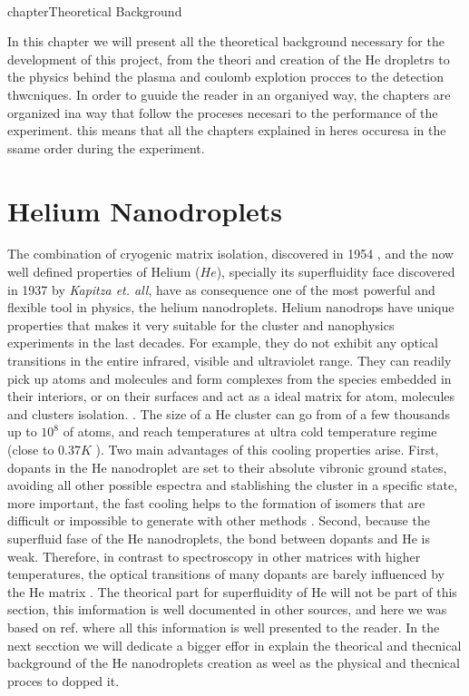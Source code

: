 
\\chapter{Theoretical Background}

In this chapter we will present all the theoretical background necessary for the development of this project, from the theori and creation of the He dropletrs to the physics behind the plasma and coulomb explotion procces to the detection thwcniques. In order to guuide the reader in an organiyed way, the chapters are organized ina way that follow the proceses necesari to the performance of the experiment. this means that all the chapters explained in heres occuresa in the ssame order during the experiment.


\section{Helium Nanodroplets}

The combination of cryogenic matrix isolation, discovered in 1954 \cite{whittle_matrix_1954}, and the now well defined properties of Helium ($He$), specially its superfluidity face discovered in 1937 by \textit{Kapitza et. all}\citep{kapitza_viscosity_1938}, have as consequence one of the most powerful and flexible tool in physics, the helium nanodroplets.
Helium nanodrops  have unique properties that makes it  very suitable for the cluster and nanophysics experiments in the last decades. For example, they do not exhibit any optical transitions in the entire infrared, visible and ultraviolet range. They can readily pick up atoms and molecules and  form complexes from the species embedded in their interiors, or on their surfaces and act as a ideal matrix for atom, molecules and clusters isolation. \citep{stienkemeier_spectroscopy_2006}\cite{toennies_superfluid_2004}.
The size of a He cluster can go from of a few thousands up to $10^{8}$ of atoms, and reach temperatures at   ultra cold temperature regime (close to 0.37$K$ \cite{toennies_spectroscopy_1998})\cite{enss_low-temperature_2005}.
Two main advantages of this  cooling properties arise. First,  dopants in the He nanodroplet are set to their absolute vibronic ground states, avoiding all other possible espectra and stablishing the cluster in a specific state, more important, the fast cooling helps to the formation of isomers that are difficult or impossible to generate with other methods \cite{nauta_nonequilibrium_1999}. Second, because the superfluid fase of the He nanodroplets\cite{grebenev_superfluidity_1998}, the bond between dopants and He is weak. Therefore, in contrast to spectroscopy in other matrices with higher temperatures, the optical transitions of many dopants are barely influenced by the He matrix \citep{toennies_superfluid_2004}. 
The theorical part for superfluidity of He will not be part of this section, this imformation is well documented in other sources, and here we was based on ref.\cite{enss_low-temperature_2005} where all this information is well presented to the reader. In the next secction we will dedicate a bigger effor in explain the theorical and thecnical background of the He nanodroplets creation as weel as the physical and thecnical proces to dopped it. 





